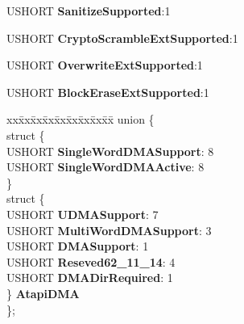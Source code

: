\begin{DoxyCompactItemize}
U\+S\+H\+O\+RT {\bfseries Sanitize\+Supported}\+:1
\item 
\mbox{\label{struct___i_d_e_n_t_i_f_y___d_a_t_a_ab5088d60552fd0a1fc6c2f892f32c99a}} 
U\+S\+H\+O\+RT {\bfseries Crypto\+Scramble\+Ext\+Supported}\+:1
\item 
\mbox{\label{struct___i_d_e_n_t_i_f_y___d_a_t_a_a6823ac64874f376dde249014d140be9f}} 
U\+S\+H\+O\+RT {\bfseries Overwrite\+Ext\+Supported}\+:1
\item 
\mbox{\label{struct___i_d_e_n_t_i_f_y___d_a_t_a_a673b5fdd1eceb571599e5f221e38e323}} 
U\+S\+H\+O\+RT {\bfseries Block\+Erase\+Ext\+Supported}\+:1
\item 
\mbox{\label{struct___i_d_e_n_t_i_f_y___d_a_t_a_a224bfd16a182ee44e7707d2959c3e402}} 
\begin{tabbing}
xx\=xx\=xx\=xx\=xx\=xx\=xx\=xx\=xx\=\kill
union \{\\
\mbox{\label{union___i_d_e_n_t_i_f_y___d_a_t_a_1_1_0D959_a7c4f7fe063d43ac6dfee41c88de01e02}} 
\>struct \{\\
\>\>USHORT {\bfseries SingleWordDMASupport}: 8\\
\>\>USHORT {\bfseries SingleWordDMAActive}: 8\\
\>\} \\
\>struct \{\\
\>\>USHORT {\bfseries UDMASupport}: 7\\
\>\>USHORT {\bfseries MultiWordDMASupport}: 3\\
\>\>USHORT {\bfseries DMASupport}: 1\\
\>\>USHORT {\bfseries Reseved62\_11\_14}: 4\\
\>\>USHORT {\bfseries DMADirRequired}: 1\\
\>\} {\bfseries AtapiDMA}\\
\}; \\


\end{tabbing}
\end{DoxyCompactItemize}
